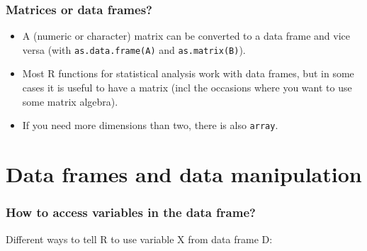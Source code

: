 \documentclass[xcolor=svgnames,handout]{beamer}
\newcommand{\code}[1]{\texttt{#1}}
\let\overbatim\verbatim
\let\endoverbatim\endverbatim
\newenvironment{vcode}%
{\bgroup\baselineskip=0.8\baselineskip\overbatim}%
{\endoverbatim\egroup}
\begin{document}
\begin{frame}[fragile]
  \frametitle{Matrices or data frames?}
  \begin{itemize}
\item A (numeric or character) matrix can be converted to a data frame and vice versa (with \code{as.data.frame(A)} and \code{as.matrix(B)}).
\item  Most R functions for statistical analysis work with data frames, but in some cases it is useful to have a matrix (incl the occasions where you want to use some matrix algebra).  
\item If you need more dimensions than two, there is also \code{array}. 
  \end{itemize}
\end{frame}


\section{Data frames and data manipulation}
\begin{frame}[fragile] 
\frametitle{How to access variables in the data frame?} 
Different ways to tell R to use variable X from data frame D: 
\end{frame}
\end{document}
